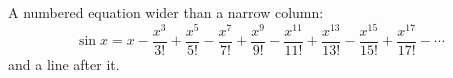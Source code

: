 A numbered equation wider than a narrow column:
\begin{equation}
  \sin x = x - \frac{x^{3}}{3!} + \frac{x^{5}}{5!} - \frac{x^{7}}{7!} + \frac{x^{9}}{9!} - \frac{x^{11}}{11!} + \frac{x^{13}}{13!} - \frac{x^{15}}{15!} + \frac{x^{17}}{17!} - \dotsb
\end{equation}
and a line after it.
